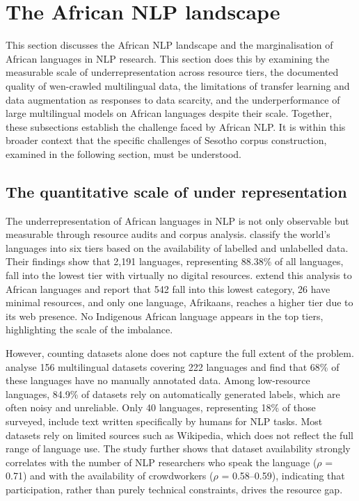 \documentclass[12pt]{ThesisRU}
\begin{document}
\clearpage
\section{The African NLP landscape}
This section discusses the African NLP landscape and the marginalisation of African languages in NLP research. This section does this by examining the measurable scale of underrepresentation across resource tiers, the documented quality of wen-crawled multilingual data, the limitations of transfer learning and data augmentation as responses to data scarcity, and the underperformance of large multilingual models on African languages despite their scale. Together, these subsections establish the challenge faced by African NLP. It is within this broader context that the specific challenges of Sesotho corpus construction, examined in the following section, must be understood.

\subsection{The quantitative scale of under representation}
The underrepresentation of African languages in NLP is not only observable but measurable through resource audits and corpus analysis. \citet{joshi2020state} classify the world’s languages into six tiers based on the availability of labelled and unlabelled data. Their findings show that 2,191 languages, representing 88.38\% of all languages, fall into the lowest tier with virtually no digital resources. \citet{adebara2022towards} extend this analysis to African languages and report that 542 fall into this lowest category, 26 have minimal resources, and only one language, Afrikaans, reaches a higher tier due to its web presence. No Indigenous African language appears in the top tiers, highlighting the scale of the imbalance.

However, counting datasets alone does not capture the full extent of the problem. \citet{yu2022beyond} analyse 156 multilingual datasets covering 222 languages and find that 68\% of these languages have no manually annotated data. Among low-resource languages, 84.9\% of datasets rely on automatically generated labels, which are often noisy and unreliable. Only 40 languages, representing 18\% of those surveyed, include text written specifically by humans for NLP tasks. Most datasets rely on limited sources such as Wikipedia, which does not reflect the full range of language use. The study further shows that dataset availability strongly correlates with the number of NLP researchers who speak the language ($\rho$ = 0.71) and with the availability of crowdworkers ($\rho$ = 0.58–0.59), indicating that participation, rather than purely technical constraints, drives the resource gap.
\end{document}
